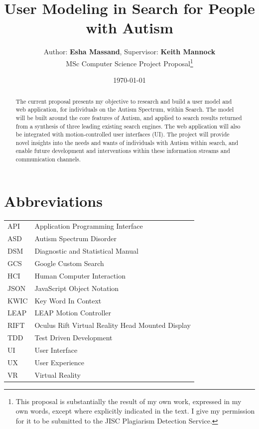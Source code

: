 \documentclass[a4paper, 10pt]{article}
\begin{document}
\title{User Modeling in Search for People with Autism}
\author{Author: \textbf{Esha Massand}, Supervisor: \textbf{Keith Mannock}\\
MSc Computer Science Project Proposal\footnote{This proposal is substantially the result of my own work, expressed in my own words, except where explicitly indicated in the text. I give my permission for it to be submitted to the JISC Plagiarism Detection Service. }}
\date{\today}
\maketitle
\begin{abstract}
The current proposal presents my objective to research and build a user model and web application, for individuals on the Autism Spectrum, within Search. The model will be built around the core features of Autism, and applied to search results returned from a synthesis of three leading existing search engines. The web application will also be integrated with motion-controlled user interfaces (UI). The project will provide novel insights into the needs and wants of individuals with Autism within search, and enable future development and interventions within these information streams and communication channels.
\end{abstract}

\tableofcontents

\section*{Abbreviations}
\begin{tabular}{l l }
API & Application Programming Interface\\
ASD & Autism Spectrum Disorder\\
DSM & Diagnostic and Statistical Manual\\
GCS & Google Custom Search\\
HCI & Human Computer Interaction\\
JSON & JavaScript Object Notation\\
KWIC & Key Word In Context\\
LEAP & LEAP Motion Controller\\
RIFT & Oculus Rift Virtual Reality Head Mounted Display\\
TDD & Test Driven Development\\
UI & User Interface\\
UX & User Experience\\
VR & Virtual Reality\\
\end{tabular}
\end{document}
